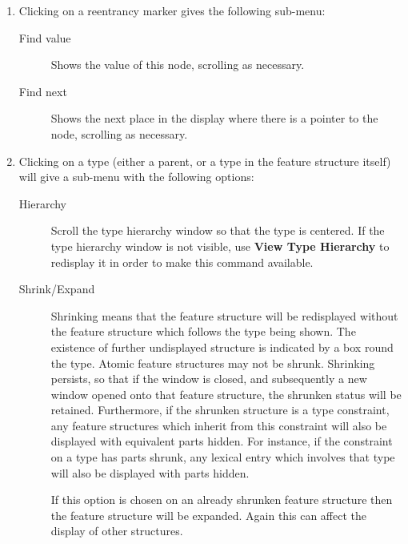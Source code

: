 \documentclass[12pt]{report}
\newcommand{\lkbmenucommand}{\bf}
\begin{document}
\begin{enumerate}
\item Clicking on a reentrancy marker gives the following sub-menu:
\begin{description}
\item[Find value] Shows the value of this node, scrolling as necessary.
\item[Find next] Shows the next place in the display where there is 
a pointer to the node, scrolling as necessary.
\end{description}
\item Clicking on a type (either a parent, or a type in the feature
structure itself) will give a sub-menu with the following options:
\begin{description}
\item[Hierarchy] Scroll the type hierarchy window so
that the type is centered.  If the type hierarchy window is not visible,
use {\lkbmenucommand View Type Hierarchy} to redisplay it in order to make
this command available.
\item[Shrink/Expand] 
Shrinking means that the feature structure will be redisplayed without
the feature structure which follows the type being shown.  The
existence of further undisplayed structure is indicated by a box round
the type.  Atomic feature structures may not be shrunk.  Shrinking
persists, so that if the
window is closed, and subsequently a new window opened onto that
feature structure, the shrunken status will be retained.  Furthermore,
if the shrunken structure is a type constraint,
any feature structures which inherit
from this constraint will also be displayed with equivalent
parts hidden.  For instance, if the constraint on a type has
parts shrunk, any lexical entry which involves that type
will also be
displayed with parts hidden. 

If this option is chosen on an already shrunken feature structure then
the feature structure will be expanded.  Again this can affect the
display of other structures.


\end{description}
\end{enumerate}
\end{document}
